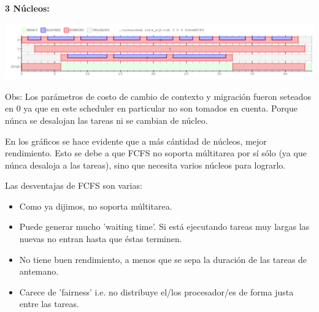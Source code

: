 \vspace{10pt}

\textbf{3 Núcleos:}
\vspace{-20pt}
\begin{center}
 \includegraphics[scale=0.45]{./FCFS/FCFS_3core.png}
\end{center}


Obs: Los parámetros de costo de cambio de contexto y migración fueron seteados en 0 ya que en este scheduler en particular
no son tomados en cuenta. Porque núnca se desalojan las tareas ni se cambian de núcleo.

En los gráficos se hace evidente que a más cántidad de núcleos, mejor rendimiento.
Esto se debe a que FCFS no soporta múltitarea por sí sólo (ya que núnca desaloja a las tareas), sino que necesita varios núcleos para lograrlo.

Las desventajas de FCFS son varias:

\begin{itemize}
\item Como ya dijimos, no soporta múltitarea.
\item Puede generar mucho 'waiting time'.
	Si está ejecutando tareas muy largas las nuevas no entran hasta que éstas terminen.
\item No tiene buen rendimiento, a menos que se sepa la duración de las tareas de antemano.
\item Carece de 'fairness' i.e. no distribuye el/los procesador/es de forma justa entre las tareas.
\end{itemize}